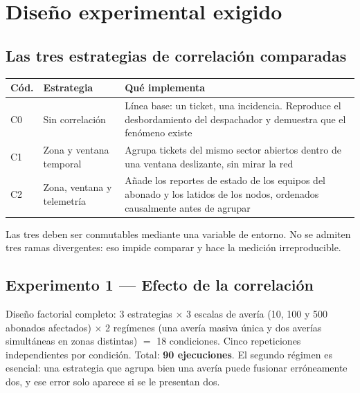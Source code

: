 \documentclass[11pt,a4paper]{article}
\begin{document}
\section{Diseño experimental exigido}

\subsection{Las tres estrategias de correlación comparadas}

\begin{center}
	\small
	\begin{tabular}{@{}p{1.1cm}p{4.8cm}p{9.1cm}@{}}
		\toprule
		\textbf{Cód.} & \textbf{Estrategia} & \textbf{Qué implementa} \\
		\midrule
		C0 & Sin correlación & Línea base: un ticket, una incidencia. Reproduce el desbordamiento del despachador y demuestra que el fenómeno existe \\
		\addlinespace
		C1 & Zona y ventana temporal & Agrupa tickets del mismo sector abiertos dentro de una ventana deslizante, sin mirar la red \\
		\addlinespace
		C2 & Zona, ventana y telemetría & Añade los reportes de estado de los equipos del abonado y los latidos de los nodos, ordenados causalmente antes de agrupar \cite{lamport1978time} \\
		\bottomrule
	\end{tabular}
\end{center}

Las tres deben ser conmutables mediante una variable de entorno. No se admiten tres ramas divergentes: eso impide comparar y hace la medición irreproducible.

\subsection{Experimento 1 --- Efecto de la correlación}

Diseño factorial completo: 3 estrategias $\times$ 3 escalas de avería (10, 100 y 500 abonados afectados) $\times$ 2 regímenes (una avería masiva única y dos averías simultáneas en zonas distintas) $=$ 18 condiciones. Cinco repeticiones independientes por condición. Total: \textbf{90 ejecuciones}. El segundo régimen es esencial: una estrategia que agrupa bien una avería puede fusionar erróneamente dos, y ese error solo aparece si se le presentan dos.
\end{document}
